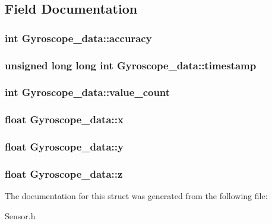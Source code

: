 \subsection{Field Documentation}
\subsubsection[{accuracy}]{\setlength{\rightskip}{0pt plus 5cm}int Gyroscope\-\_\-data\-::accuracy}\label{struct__3d__data_a797c011d45c67bea55fae4862e68588b}
\subsubsection[{timestamp}]{\setlength{\rightskip}{0pt plus 5cm}unsigned long long int Gyroscope\-\_\-data\-::timestamp}\label{struct__3d__data_a40927dec34808fdd878f805bd5c942ab}
\subsubsection[{value\-\_\-count}]{\setlength{\rightskip}{0pt plus 5cm}int Gyroscope\-\_\-data\-::value\-\_\-count}\label{struct__3d__data_abf551f62d36ae9d11a45d6190a8ce5c9}
\subsubsection[{x}]{\setlength{\rightskip}{0pt plus 5cm}float Gyroscope\-\_\-data\-::x}\label{struct__3d__data_a0c31bfc2e194e0dbbc49cc7c7fc618f7}
\subsubsection[{y}]{\setlength{\rightskip}{0pt plus 5cm}float Gyroscope\-\_\-data\-::y}\label{struct__3d__data_a5e1b129b17b1e6ea12ff55fe77ad869f}
\subsubsection[{z}]{\setlength{\rightskip}{0pt plus 5cm}float Gyroscope\-\_\-data\-::z}\label{struct__3d__data_a61138bed3867232c4492267b848f5d2c}


The documentation for this struct was generated from the following file\-:\begin{DoxyCompactItemize}
\item 
Sensor.\-h\end{DoxyCompactItemize}
